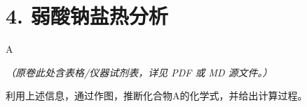 \section*{4. 弱酸钠盐热分析}
A

\textit{（原卷此处含表格/仪器试剂表，详见 PDF 或 MD 源文件。）}

利⽤上述信息，通过作图，推断化合物A的化学式，并给出计算过程。
